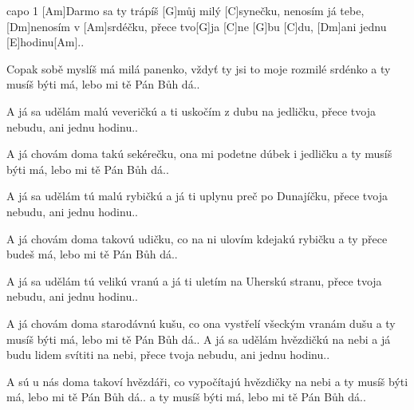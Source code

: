 
capo 1
[Am]Darmo sa ty trápíš [G]můj milý [C]synečku,
nenosím já tebe, [Dm]nenosím v [Am]srdéčku,
přece tvo[G]ja [C]ne [G]bu [C]du, 
[Dm]ani jednu [E]hodinu[Am]..

Copak sobě myslíš má milá panenko,
vždyť ty jsi to moje rozmilé srdénko
a ty musíš býti má, lebo mi tě Pán Bůh dá..


A já sa udělám malú veveričkú
a ti uskočím z dubu na jedličku,
přece tvoja nebudu, ani jednu hodinu..

A já chovám doma takú sekérečku,
ona mi podetne dúbek i jedličku
a ty musíš býti má, lebo mi tě Pán Bůh dá..

A já sa udělám tú malú rybičkú
a já ti uplynu preč po Dunajíčku,
přece tvoja nebudu, ani jednu hodinu..

A já chovám doma takovú udičku,
co na ni ulovím kdejakú rybičku
a ty přece budeš má, lebo mi tě Pán Bůh dá..

A já sa udělám tú velikú vranú
a já ti uletím na Uherskú stranu,
přece tvoja nebudu, ani jednu hodinu..

A já chovám doma starodávnú kušu,
co ona vystřelí všeckým vranám dušu
a ty musíš býti má, lebo mi tě Pán Bůh dá..
\slpc
A já sa udělám hvězdičkú na nebi
a já budu lidem svítiti na nebi,
přece tvoja nebudu, ani jednu hodinu..

A sú u nás doma takoví hvězdáři,
co vypočítajú hvězdičky na nebi
a ty musíš býti má, lebo mi tě Pán Bůh dá..
a ty musíš býti má, lebo mi tě Pán Bůh dá..
